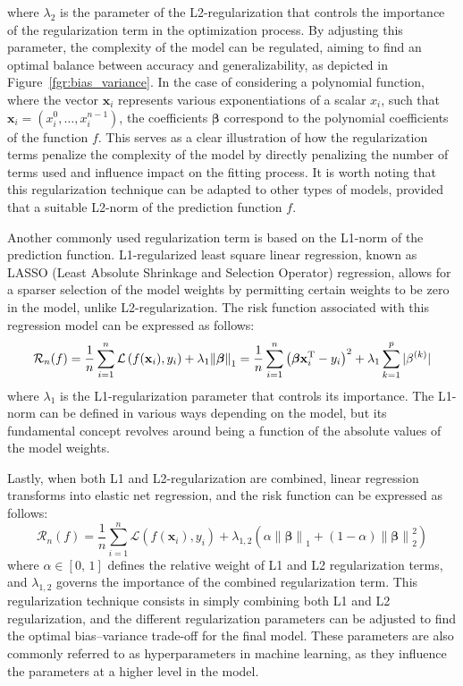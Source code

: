 \documentclass[main]{subfiles}
\begin{document}
where $\lambda_2$ is the parameter of the L2-regularization that controls the importance of the regularization term in the optimization process. By adjusting this parameter, the complexity of the model can be regulated, aiming to find an optimal balance between accuracy and generalizability, as depicted in Figure~\ref{fgr:bias_variance}. In the case of considering a polynomial function, where the vector $\mathbf{x}_i$ represents various exponentiations of a scalar $x_i$, such that $\mathbf{x}_i=\left(x_i^0,\ldots,x_i^{n-1}\right)$, the coefficients $\boldsymbol{\beta}$ correspond to the polynomial coefficients of the function $f$. This serves as a clear illustration of how the regularization terms penalize the complexity of the model by directly penalizing the number of terms used and influence impact on the fitting process. It is worth noting that this regularization technique can be adapted to other types of models, provided that a suitable L2-norm of the prediction function $f$.

Another commonly used regularization term is based on the L1-norm of the prediction function. L1-regularized least square linear regression, known as LASSO (Least Absolute Shrinkage and Selection Operator) regression, allows for a sparser selection of the model weights by permitting certain weights to be zero in the model, unlike L2-regularization. The risk function associated with this regression model can be expressed as follows:
\begin{equation}\label{eq:L1_reg}
  \mathcal{R}_n(f) = \frac{1}{n}\sum_{i=1}^n \mathcal{L}\left(f(\mathbf{x}_i),y_i\right) + \lambda_1{\lVert \boldsymbol{\beta} \rVert}_1 = \frac{1}{n}\sum_{i=1}^n {\left(\boldsymbol{\beta}\mathbf{x}_i^{\text{T}}-y_i\right)}^2 + \lambda_1 \sum_{k=1}^p |\beta^{(k)}|
\end{equation}
where $\lambda_1$ is the L1-regularization parameter that controls its importance. The L1-norm can be defined in various ways depending on the model, but its fundamental concept revolves around being a function of the absolute values of the model weights.

Lastly, when both L1 and L2-regularization are combined, linear regression transforms into elastic net regression, and the risk function can be expressed as follows:
\begin{equation}\label{eq:elasticnet_reg}
  \mathcal{R}_n(f) = \frac{1}{n}\sum_{i=1}^n \mathcal{L}\left(f(\mathbf{x}_i),y_i\right) + \lambda_{1,2} \left({\alpha \lVert \boldsymbol{\beta} \rVert }_1 + (1-\alpha) {\lVert \boldsymbol{\beta} \rVert}_2^2\right)
\end{equation}
where $\alpha\in[0,\,1]$ defines the relative weight of L1 and L2 regularization terms, and $\lambda_{1,2}$ governs the importance of the combined regularization term. This regularization technique consists in simply combining both L1 and L2 regularization, and the different regularization parameters can be adjusted to find the optimal bias--variance trade-off for the final model. These parameters are also commonly referred to as hyperparameters in machine learning, as they influence the parameters at a higher level in the model.
\end{document}
